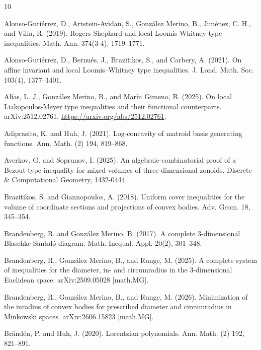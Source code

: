\documentclass[11pt]{amsart}
\theoremstyle{definition}
\theoremstyle{remark}
\begin{document}
\begin{thebibliography}{10}

 Alonso-Gutiérrez, D., Artstein-Avidan, S., González Merino, B., Jiménez, C. H., and Villa, R. (2019). Rogers-Shephard and local Loomis-Whitney type inequalities. Math. Ann. 374(3-4), 1719–1771.

 Alonso-Gutiérrez, D., Bernués, J., Brazitikos, S., and Carbery, A. (2021). On affine invariant and local Loomis–Whitney type inequalities. J. Lond. Math. Soc. 103(4), 1377–1401.

 Alías, L. J., González Merino, B., and Marín Gimeno, B. (2025). On local Liakopoulos-Meyer type inequalities and their functional counterparts. arXiv:2512.02761. \url{https://arxiv.org/abs/2512.02761}.

 Adiprasito, K. and Huh, J. (2021). Log-concavity of matroid basis generating functions. Ann. Math. (2) 194, 819–868.

 Averkov, G. and Soprunov, I. (2025). An algebraic-combinatorial proof of a Bezout-type inequality for mixed volumes of three-dimensional zonoids. Discrete \& Computational Geometry, 1432-0444.



 Brazitikos, S. and Giannopoulos, A. (2018). Uniform cover inequalities for the volume of coordinate sections and projections of convex bodies. Adv. Geom. 18, 345–354.

 Brandenberg, R. and González Merino, B. (2017). A complete 3-dimensional Blaschke-Santaló diagram. Math. Inequal. Appl. 20(2), 301–348.

 Brandenberg, R., González Merino, B., and Runge, M. (2025). A complete system of inequalities for the diameter, in- and circumradius in the 3-dimensional Euclidean space. arXiv:2509.05028 [math.MG].

 Brandenberg, R., González Merino, B., and Runge, M. (2026). Minimization of the inradius of convex bodies for prescribed diameter and circumradius in Minkowski spaces. arXiv:2606.15823 [math.MG].

 Brändén, P. and Huh, J. (2020). Lorentzian polynomials. Ann. Math. (2) 192, 821–891.


\end{thebibliography}
\end{document}
